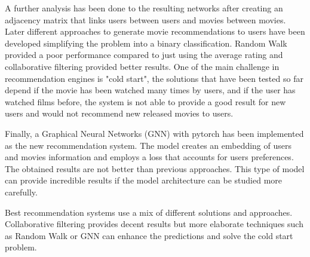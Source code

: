 \documentclass[12pt]{article}
\numberwithin{equation}{section}
\begin{document}
A further analysis has been done to the resulting networks after creating an adjacency matrix that links users between users and movies between movies. Later different approaches to generate movie recommendations to users have been developed simplifying the problem into a binary classification. Random Walk provided a poor performance compared to just using the average rating and collaborative filtering provided better results. One of the main challenge in recommendation engines is "cold start", the solutions that have been tested so far depend if the movie has been watched many times by users, and if the user has watched films before, the system is not able to provide a good result for new users and would not recommend new released movies to users. 

Finally, a Graphical Neural Networks (GNN) with pytorch has been implemented as the new recommendation system. The model creates an embedding of users and movies information and employs a loss that accounts for users preferences. The obtained results are not better than previous approaches. This type of model can provide incredible results if the model architecture can be studied more carefully. 

Best recommendation systems use a mix of different solutions and approaches. Collaborative filtering provides decent results but more elaborate techniques such as Random Walk or GNN can enhance the predictions and solve the cold start problem. 



\vspace{1em} 




\newpage



\printbibliography
\end{document}
